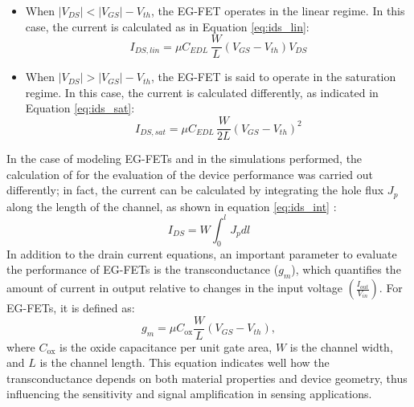 \begin{itemize}
    \item When $\lvert V_{DS} \rvert < \lvert V_{GS} \rvert - V_{th}$, the EG-FET operates in the linear regime. In this case, the current is calculated as in Equation \eqref{eq:ids_lin}:
    \begin{equation}
        \label{eq:ids_lin}
        I_{DS,lin} = \mu C_{EDL}\,\frac{W}{L}\left(V_{GS}-V_{th}\right)V_{DS}
    \end{equation}
    \item When $\lvert V_{DS} \rvert > \lvert V_{GS} \rvert - V_{th}$, the EG-FET is said to operate in the saturation regime. In this case, the current is calculated differently, as indicated in Equation \eqref{eq:ids_sat}:
    \begin{equation}
        \label{eq:ids_sat}
        I_{DS,sat} = \mu C_{EDL}\,\frac{W}{2L}\left(V_{GS}-V_{th}\right)^2
    \end{equation}
\end{itemize}
%
In the case of modeling EG-FETs and in the simulations performed, the calculation of \ids{} for the evaluation of the device performance was carried out differently; in fact, the current can be calculated by integrating the hole flux $J_p$ along the length of the channel, as shown in equation \eqref{eq:ids_int} \citep{newmanElectrochemical2021, chennitInkjetPrinted2023}:
%
\begin{equation}
    \label{eq:ids_int}
    I_{DS} = W \int_{0}^{l}J_p dl
 \end{equation}
%
In addition to the drain current equations, an important parameter to evaluate the performance of EG-FETs is the transconductance ($g_m$), which quantifies the amount of current in output relative to changes in the input voltage $\left(\frac{I_{out}}{V_{in}} \right)$. For EG-FETs, it is defined as:
%
\begin{equation}
    \label{eq:transconductance}
    g_m = \mu C_{\text{ox}} \frac{W}{L} (V_{GS} - V_{th}),
\end{equation}
%
where $C_{\text{ox}}$ is the oxide capacitance per unit gate area, $W$ is the channel width, and $L$ is the channel length. This equation indicates well how the transconductance depends on both material properties and device geometry, thus influencing the sensitivity and signal amplification in sensing applications.
